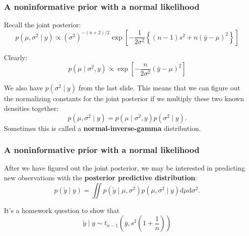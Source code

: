 \documentclass{beamer}
\begin{document}
\begin{frame}
\frametitle{A noninformative prior with a normal likelihood}

Recall the joint posterior:
\[
p(\mu, \sigma^2 \mid y) \propto (\sigma^2)^{-(n+2)/2}\exp\left[ - \frac{1}{2\sigma^2}\left\{(n-1)  s^2 + n(\bar{y} - \mu)^2 \right\} \right]
\]

Clearly:
\[
p(\mu \mid \sigma^2, y) \propto \exp\left[ - \frac{n}{2\sigma^2} (\bar{y} - \mu)^2  \right]
\]
\pause

We also have $p(\sigma^2 \mid y)$ from the last slide. This means that we can figure out the normalizing constants for the joint posterior if we multiply these two known densities together:
\[
p(\mu, \sigma^2 \mid y) = p(\mu \mid \sigma^2,y) p(\sigma^2 \mid y).
\]
Sometimes this is called a {\bf normal-inverse-gamma} distribution.

\end{frame}


\begin{frame}
\frametitle{A noninformative prior with a normal likelihood}

After we have figured out the joint posterior, we may be interested in predicting new observations with the {\bf posterior predictive distribution}:
\[
p(\tilde{y} \mid y) = \iint p(\tilde{y} \mid \mu, \sigma^2) p(\mu, \sigma^2 \mid y) \text{d} \mu \text{d} \sigma^2.
\]

It's a homework question to show that 
\[
\tilde{y} \mid y \sim t_{n-1}\left(\bar{y}, s^2\left(1 + \frac{1}{n} \right) \right)
\]

\end{frame}
\end{document}
